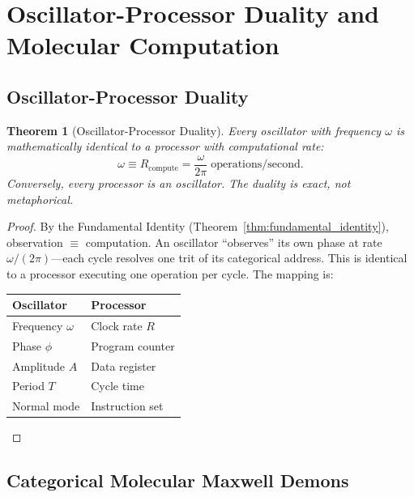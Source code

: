 \documentclass[twocolumn,10pt]{article}
\newtheorem{theorem}{Theorem}[section]
\theoremstyle{definition}
\begin{document}
\section{Oscillator-Processor Duality and Molecular Computation}\label{sec:oscillator_processor}

\subsection{Oscillator-Processor Duality}

\begin{theorem}[Oscillator-Processor Duality]\label{thm:osc_proc}
Every oscillator with frequency $\omega$ is mathematically identical to a processor with computational rate:
\begin{equation}\label{eq:osc_proc}
    \boxed{\omega \equiv R_{\mathrm{compute}} = \frac{\omega}{2\pi} \;\text{operations/second}.}
\end{equation}
Conversely, every processor is an oscillator. The duality is exact, not metaphorical.
\end{theorem}

\begin{proof}
By the Fundamental Identity (Theorem~\ref{thm:fundamental_identity}), observation $\equiv$ computation. An oscillator ``observes'' its own phase at rate $\omega/(2\pi)$---each cycle resolves one trit of its categorical address. This is identical to a processor executing one operation per cycle. The mapping is:
\begin{center}
\begin{tabular}{ll}
\textbf{Oscillator} & \textbf{Processor} \\
\hline
Frequency $\omega$ & Clock rate $R$ \\
Phase $\phi$ & Program counter \\
Amplitude $A$ & Data register \\
Period $T$ & Cycle time \\
Normal mode & Instruction set
\end{tabular}
\end{center}
\end{proof}

\subsection{Categorical Molecular Maxwell Demons}
\end{document}
